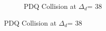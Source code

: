 \documentclass[letterpaper]{article}
\newcommand{\maxdist}{\ensuremath{{\Delta_d}}}
\begin{document}
\begin{figure}[t]
\begin{subfigure}[t]{0.48\linewidth}
    \caption{PDQ Collision at \maxdist = 38}
    \label{fig:intro:fuzzy-gen:pdq:best}
    \end{subfigure}
\end{figure}
\end{document}
